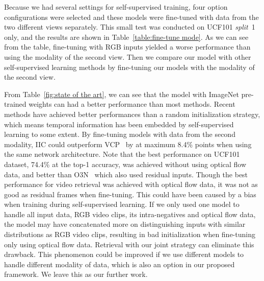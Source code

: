 \documentclass[sigconf]{acmart}
\begin{document}
Because we had several settings for self-supervised training, four option configurations were selected and these models were fine-tuned with data from the two different views separately. This small test was conducted on UCF101 \textit{split}~1 only, and the results are shown in Table~\ref{table:fine-tune mode}. 
As we can see from the table, fine-tuning with RGB inputs yielded a worse performance than using the modality of the second view. Then we compare our model with other self-supervised learning methods by fine-tuning our models with the modality of the second view.

\begin{table}[tb]
\centering
  \caption{Results for different fine-tuning modes.}
  \label{table:fine-tune mode}
\end{table}

From Table~\ref{fig:state of the art}, we can see that the model with ImageNet pre-trained weights can had a better performance than most methods. Recent methods have achieved better performances than a random initialization strategy, which means temporal information has been embedded by self-supervised learning to some extent. By fine-tuning models with data from the second modality, IIC could outperform VCP~\cite{luo2020video} by at maximum 8.4\% points when using the same network architecture. Note that the best performance on UCF101 dataset, 74.4\% at the top-1 accuracy, was achieved without using optical flow data, and better than O3N~\cite{fernando2017self} which also used residual inputs. Though the best performance for video retrieval was achieved with optical flow data, it was not as good as residual frames when fine-tuning. This could have been caused by a bias when training during self-supervised learning. If we only used one model to handle all input data, RGB video clips, its intra-negatives and optical flow data, the model may have concatenated more on distinguishing inputs with similar distributions as RGB video clips, resulting in bad initialization when fine-tuning only using optical flow data. Retrieval with our joint strategy can eliminate this drawback. This phenomenon could be improved if we use different models to handle different modality of data, which is also an option in our proposed framework. We leave this as our further work. 
\end{document}
